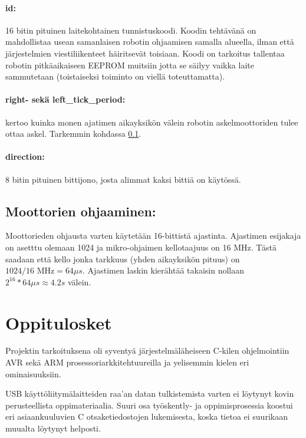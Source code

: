 \documentclass[]{article} %
\numberwithin{equation}{section}
\numberwithin{figure}{section}
\numberwithin{table}{section}
\begin{document}
\paragraph{id:} 16 bitin pituinen laitekohtainen tunnistuskoodi. Koodin tehtävänä on mahdollistaa usean samanlaisen robotin ohjaamisen samalla alueella, ilman että järjestelmien viestiliikenteet häiritsevät toisiaan. Koodi on tarkoitus tallentaa robotin pitkäaikaiseen EEPROM muitsiin jotta se säilyy vaikka laite sammutetaan (toistaiseksi toiminto on viellä toteuttamatta).

\paragraph{right- sekä left\_tick\_period:} kertoo kuinka monen ajatimen aikayksikön välein robotin askelmoottoriden tulee ottaa askel. Tarkemmin kohdassa \ref{sec:Moottorien ohjaaminen}.
 
\paragraph{direction:} 8 bitin pituinen bittijono, josta alimmat kaksi bittiä on käytössä.


\subsection{Moottorien ohjaaminen:}
\label{sec:Moottorien ohjaaminen}


Moottorieden ohjausta varten käytetään 16-bittistä ajastinta. Ajastimen esijakaja on asetttu olemaan 1024 ja mikro-ohjaimen kellotaajuus on 16 MHz. Tästä saadaan että kello jonka tarkkuus (yhden aikayksikön pituus) on $1024/16 \text{ MHz} = 64 \mu s $. Ajastimen laskin kierähtää takaisin nollaan $2^{16} * 64\mu s \approx 4.2 s$ välein. 


\section{Oppitulosket}
\label{sec:Oppitulosket}

Projektin tarkoituksena oli syventyä järjestelmäläheiseen C-kilen ohjelmointiin AVR sekä ARM prosessoriarkkitehtuureilla ja yelisemmin kielen eri ominaisuuksiin.

USB käyttöliitymälaitteiden raa'an datan tulkistemista varten ei löytynyt kovin perusteellista oppimateriaalia.
Suuri osa työskently- ja oppimisprosessia koostui eri asiaankuuluvien C otsaketiedostojen lukemisesta, koska tietoa ei suurikaan muualta löytynyt helposti. 
\end{document}
